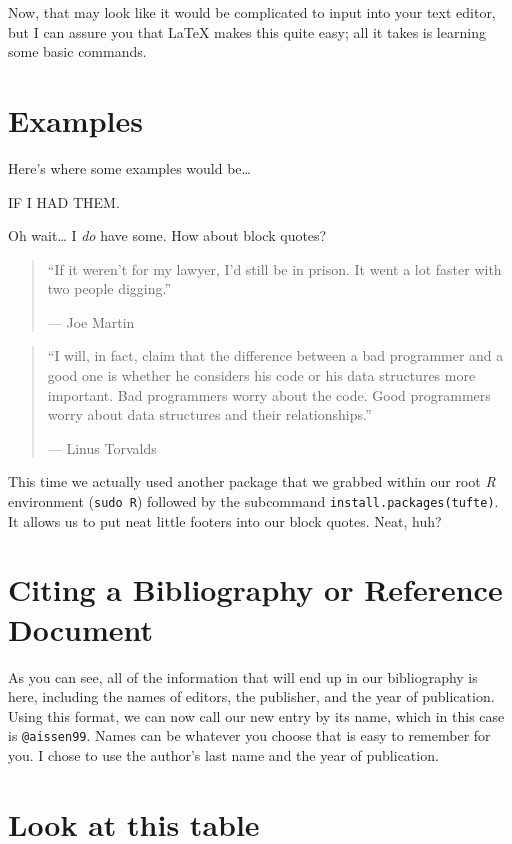 \documentclass[
]{article}
\begin{document}
Now, that may look like it would be complicated to input into your text
editor, but I can assure you that \LaTeX{} makes this quite easy; all it
takes is learning some basic commands.

\section{Examples}

Here's where some examples would be\ldots{}

IF I HAD THEM.

Oh wait\ldots{} I \emph{do} have some. How about block quotes?

\begin{quote}
``If it weren't for my lawyer, I'd still be in prison. It went a lot
faster with two people digging.''

\hfill --- Joe Martin
\end{quote}

\begin{quote}
``I will, in fact, claim that the difference between a bad programmer
and a good one is whether he considers his code or his data structures
more important. Bad programmers worry about the code. Good programmers
worry about data structures and their relationships.''

\hfill --- Linus Torvalds
\end{quote}

This time we actually used another package that we grabbed within our
root \emph{R} environment (\texttt{sudo\ R}) followed by the subcommand
\texttt{install.packages(\textquotesingle{}tufte\textquotesingle{})}. It
allows us to put neat little footers into our block quotes. Neat, huh?

\section{Citing a Bibliography or Reference Document}

As you can see, all of the information that will end up in our
bibliography is here, including the names of editors, the publisher, and
the year of publication. Using this format, we can now call our new
entry by its name, which in this case is \texttt{@aissen99}. Names can
be whatever you choose that is easy to remember for you. I chose to use
the author's last name and the year of publication.

\hypertarget{look-at-this-table}{%
\section{Look at this table}\label{look-at-this-table}}
\end{document}
